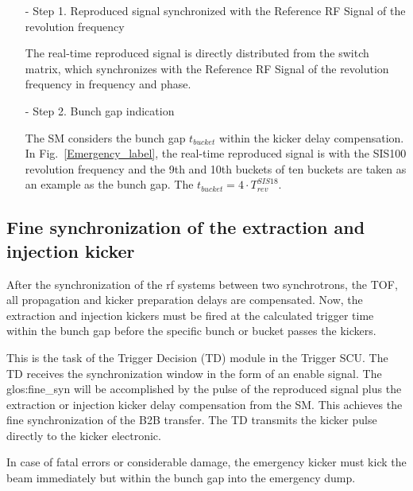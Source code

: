 \begin{itemize}
\begin{itemize}
\item[-] Step 1. Reproduced signal synchronized with the Reference RF Signal of the revolution frequency

The real-time reproduced signal is directly distributed from the switch matrix, which synchronizes with the Reference RF Signal of the revolution frequency in frequency and phase.
\item[-] Step 2. Bunch gap indication

The SM considers the bunch gap $t_{\mathit{bucket}}$ within the kicker delay compensation. In Fig.~\ref{Emergency_label}, the real-time reproduced signal is with the SIS100 revolution frequency and the 9th and 10th buckets of ten buckets are taken as an example as the bunch gap. The $t_{\mathit{bucket}}=4\cdot T_{\mathit{rev}}^{\mathit{SIS18}}$.

\end{itemize}

\end{itemize}

\subsection{Fine synchronization of the extraction and injection kicker}
After the synchronization of the rf systems between two synchrotrons, the TOF, all propagation and kicker preparation delays are compensated. Now, the extraction and injection kickers must be fired at the calculated trigger time within the bunch gap before the specific bunch or bucket passes the kickers.
 
This is the task of the Trigger Decision (TD) module in the Trigger SCU. The TD receives the  synchronization window in the form of an enable signal. The \gls{glos:fine_syn} will be accomplished by the pulse of the reproduced signal plus the extraction or injection kicker delay compensation from the SM. This achieves the fine synchronization of the B2B transfer. The TD transmits the kicker pulse directly to the kicker electronic.  
 
In case of fatal errors or considerable damage, the emergency kicker must kick the beam immediately but within the bunch gap into the emergency dump.



